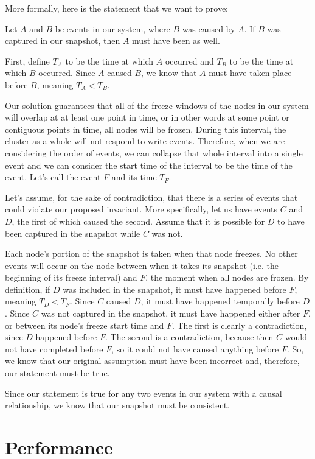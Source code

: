 More formally, here is the statement that we want to prove:

Let $A$ and $B$ be events in our system, where $B$ was caused by
$A$. If $B$ was captured in our snapshot, then $A$ must have been as
well.

First, define $T_A$ to be the time at which $A$ occurred and $T_B$ to
be the time at which $B$ occurred. Since $A$ caused $B$, we know that
$A$ must have taken place before $B$, meaning $T_A < T_B$.

Our solution guarantees that all of the freeze windows of the nodes in
our system will overlap at at least one point in time, or in other
words at some point or contiguous points in time, all nodes will be
frozen.  During this interval, the cluster as a whole will not respond
to write events. Therefore, when we are considering the order of
events, we can collapse that whole interval into a single event and we
can consider the start time of the interval to be the time of the
event. Let's call the event $F$ and its time $T_F$.

Let's assume, for the sake of contradiction, that there is a series of
events that could violate our proposed invariant. More specifically,
let us have events $C$ and $D$, the first of which caused the
second. Assume that it is possible for $D$ to have been captured in
the snapshot while $C$ was not.

Each node's portion of the snapshot is taken when that node
freezes. No other events will occur on the node between when it takes
its snapshot (i.e. the beginning of its freeze interval) and $F$, the
moment when all nodes are frozen. By definition, if $D$ was included
in the snapshot, it must have happened before $F$, meaning $T_D
<T_F$. Since $C$ caused $D$, it must have happened temporally before
$D$.  Since $C$ was not captured in the snapshot, it must have
happened either after $F$, or between its node's freeze start time and
$F$. The first is clearly a contradiction, since $D$ happened before
$F$. The second is a contradiction, because then $C$ would not have
completed before $F$, so it could not have caused anything before
$F$. So, we know that our original assumption must have been incorrect
and, therefore, our statement must be true.

Since our statement is true for any two events in our system with a
causal relationship, we know that our snapshot must be consistent.

\section{Performance}

